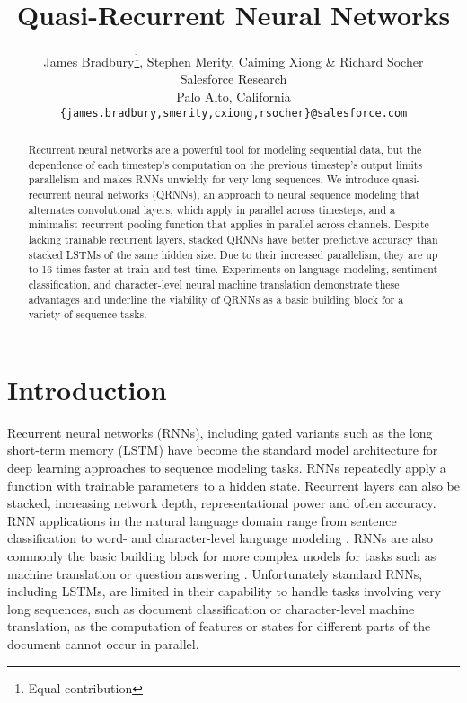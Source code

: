 \documentclass{article} \usepackage{iclr2017_conference,times}
\title{Quasi-Recurrent Neural Networks}
\author{James Bradbury\thanks{Equal contribution}, Stephen Merity\footnotemark[1], Caiming Xiong \& Richard Socher \\
Salesforce Research\\
Palo Alto, California \\
\texttt{\{james.bradbury,smerity,cxiong,rsocher\}@salesforce.com}}
\begin{document}
\maketitle

\begin{abstract}
Recurrent neural networks are a powerful tool for modeling sequential data, but the dependence of each timestep's computation on the previous timestep's output limits parallelism and makes RNNs unwieldy for very long sequences. We introduce quasi-recurrent neural networks (QRNNs), an approach to neural sequence modeling that alternates convolutional layers, which apply in parallel across timesteps, and a minimalist recurrent pooling function that applies in parallel across channels. Despite lacking trainable recurrent layers, stacked QRNNs have better predictive accuracy than stacked LSTMs of the same hidden size. Due to their increased parallelism, they are up to 16 times faster at train and test time.
Experiments on language modeling, sentiment classification, and character-level neural machine translation demonstrate these advantages and underline the viability of QRNNs as a basic building block for a variety of sequence tasks.
\end{abstract}

\section{Introduction}

Recurrent neural networks (RNNs), including gated variants such as the long short-term memory (LSTM) \citep{Hochreiter1997} have become the standard model architecture for deep learning approaches to sequence modeling tasks. RNNs repeatedly apply a function with trainable parameters to a hidden state. Recurrent layers can also be stacked, increasing network depth, representational power and often accuracy.
RNN applications in the natural language domain range from sentence classification \citep{Wang2015}
to word- and character-level language modeling \citep{Zaremba2014}. RNNs are also commonly the basic building block for more complex models for tasks such as machine translation \citep{Bahdanau2015,Luong2015,Bradbury2016} or question answering \citep{Kumar2016,Xiong2016}.
Unfortunately standard RNNs, including LSTMs, are limited in their capability to handle tasks involving very long sequences, such as document classification or character-level machine translation, as the computation of features or states for different parts of the document cannot occur in parallel.
\end{document}
